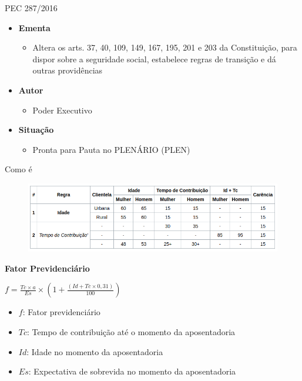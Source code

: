 \begin{frame}
  \begin{block}{PEC 287/2016}
    \begin{itemize}
      \item \textbf{Ementa}
      \begin{itemize}
        \item Altera os arts. 37, 40, 109, 149, 167, 195, 201 e 203 da
        Constituição, para dispor sobre a seguridade social, estabelece regras
        de transição e dá outras providências
      \end{itemize}
      \item \textbf{Autor}
      \begin{itemize}
        \item Poder Executivo
      \end{itemize}
      \item \textbf{Situação}
      \begin{itemize}
        \item Pronta para Pauta no PLENÁRIO (PLEN)
      \end{itemize}
    \end{itemize}
  \end{block}
\end{frame}

\begin{frame}{Como é}
  \begin{figure}[h]
  	\begin{center}
      \includegraphics [scale=0.42]{./Figures/comoe}
  	\end{center}
  \end{figure}
  \textbf{Fator Previdenciário}
  	\begin{center}
    $f = \frac{Tc \times a}{Es} \times \left ( 1 + \frac{(Id + Tc \times
    0,31)}{100} \right )$
  	\end{center}
  \begin{itemize}
    \scriptsize
    \item $f$: Fator previdenciário
    \item $Tc$: Tempo de contribuição até o momento da aposentadoria
    \item $Id$: Idade no momento da aposentadoria
    \item $Es$: Expectativa de sobrevida no momento da aposentadoria
  \end{itemize}
\end{frame}

